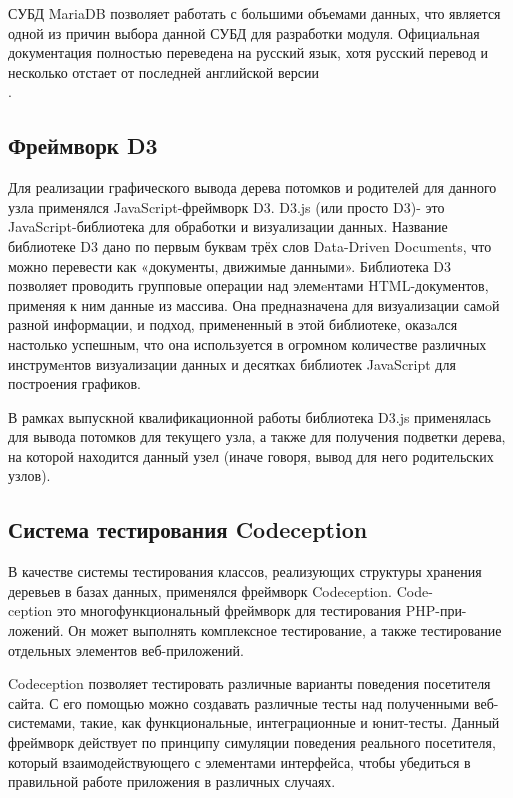 \documentclass[a4paper,14pt]{extreport}
\theoremstyle{definition}
\begin{document}
СУБД MariaDB позволяет работать с большими объемами данных, что является одной из причин выбора данной СУБД для разработки модуля. Официальная документация полностью переведена на русский язык\cite{MariaDBRus}, хотя русский перевод и несколько отстает от последней английской версии \\ \cite{MariaDB}.
\subsection{Фреймворк D3}
Для реализации графического вывода дерева потомков и родителей для данного узла применялся JavaScript-фреймворк D3\cite{D3Tutorial}.
D3.js (или просто D3)- это JavaScript-библиотека для обработки и визуализации данных. Название библиотеке D3 дано по первым буквам трёх слов Data-Driven Documents, что можно перевести как «документы, движимые данными». Библиотека D3 позволяет проводить групповые операции над элемeнтами HTML-документов, применяя к ним данные из массива. Она предназначена для визуализации самoй разной информации, и подход, примененный в этой библиотеке, оказaлся настолько успешным, что она используется в огромном количестве различных инструмeнтов визуализации данных и десятках библиотек JavaScript для построения графиков.

В рамках выпускной квалификационной работы библиотека D3.js применялась для вывода потомков для текущего узла, а также для получения подветки дерева, на которой находится данный узел (иначе говоря, вывод для него родительских узлов).
\subsection{Система тестирования Codeception}
В качестве системы тестирования классов, реализующих структуры хранения деревьев в базах данных, применялся фреймворк Codeception. Code- \\ ception это многофункциональный фреймворк для тестирования PHP-при-\\ложений. Он может выполнять комплексное тестирование, а также тестирование отдельных элементов веб-приложений.

Codeception позволяет тестировать различные варианты поведения посетителя сайта. С его помощью можно создавать различные тесты над полученными веб-системами, такие, как функциональные, интеграционные и юнит-тесты.  Данный фреймворк действует по принципу симуляции поведения реального посетителя, который взаимодействующего с элементами интерфейса, чтобы убедиться в правильной работе приложения в различных случаях.
\end{document}
